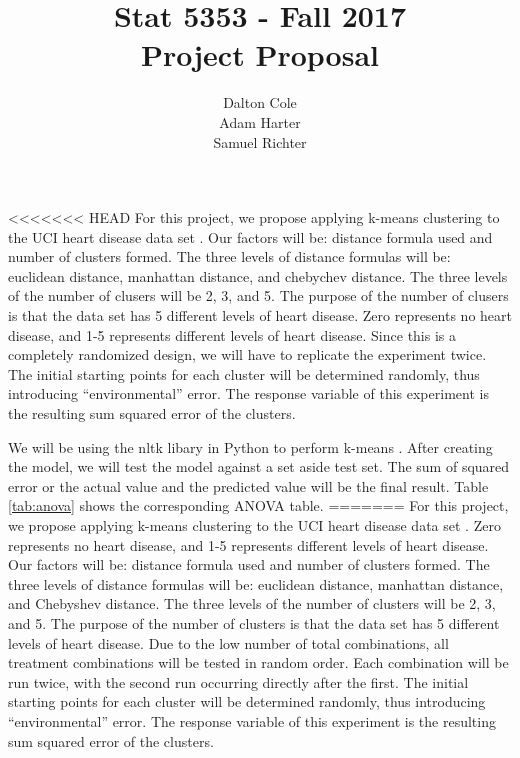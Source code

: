 \documentclass[times]{article}
\begin{document}
	\title{Stat 5353  - Fall 2017 \\ Project Proposal}
	\author{Dalton Cole \\ Adam Harter \\ Samuel Richter}
	\date{}
	\maketitle
	
<<<<<<< HEAD
	For this project, we propose applying k-means clustering to the UCI heart disease data set \cite{ref:uci}. Our factors will be: distance formula used and number of clusters formed. The three levels of distance formulas will be: euclidean distance, manhattan distance, and chebychev distance. The three levels of the number of clusers will be 2, 3, and 5. The purpose of the number of clusers is that the data set has 5 different levels of heart disease. Zero represents no heart disease, and 1-5 represents different levels of heart disease. Since this is a completely randomized design, we will have to replicate the experiment twice. The initial starting points for each cluster will be determined randomly, thus introducing ``environmental'' error. The response variable of this experiment is the resulting sum squared error of the clusters.

	We will be using the nltk libary in Python to perform k-means \cite{ref:nltk}. After creating the model, we will test the model against a set aside test set. The sum of squared error or the actual value and the predicted value will be the final result. Table \ref{tab:anova} shows the corresponding ANOVA table.
=======
	For this project, we propose applying k-means clustering to the UCI heart disease data set \cite{ref:uci}. 
   Zero represents no heart disease, and 1-5 represents different levels of heart disease.
   Our factors will be: distance formula used and number of clusters formed. 
   The three levels of distance formulas will be: euclidean distance, manhattan distance, and Chebyshev distance. 
   The three levels of the number of clusters will be 2, 3, and 5. 
   The purpose of the number of clusters is that the data set has 5 different levels of heart disease.
   Due to the low number of total combinations, all treatment combinations will be tested in random order.
   Each combination will be run twice, with the second run occurring directly after the first.
   The initial starting points for each cluster will be determined randomly, thus introducing ``environmental'' error. 
   The response variable of this experiment is the resulting sum squared error of the clusters.
\end{document}
